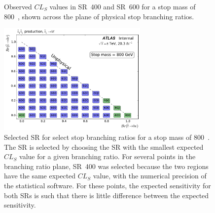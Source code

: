 \begin{figure}[ht]
  \centering
  \caption{
    Observed $CL_S$ values in SR~400 and SR~600 for a stop mass of 800~\GeV,
    shown across the plane of physical stop branching ratios.
  }
\end{figure}

\begin{figure}[ht]
  \centering
  \includegraphics[width=0.65\textwidth]
    {figs/blstop/region_selection/region_choice_vs_br_m_800.pdf}
  \caption{
    Selected SR for select stop branching ratios for a stop mass of 800~\GeV.
    The SR is selected by choosing the SR with the smallest expected $CL_S$
    value for a given branching ratio.
    For several points in the branching ratio plane, SR~400 was selected because
    the two regions have the same expected $CL_S$ value, with the numerical
    precision of the statistical software.
    For these points, the expected sensitivity for both SRs is such that
    there is little difference between the expected sensitivity.
  }
\end{figure}

